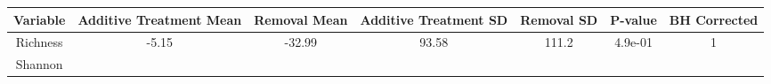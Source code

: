 \documentclass[12pt,]{article}
\begin{document}
\begin{longtable}[]{@{}ccccccc@{}}
\toprule
\begin{minipage}[b]{0.14\columnwidth}\centering\strut
Variable\strut
\end{minipage} & \begin{minipage}[b]{0.16\columnwidth}\centering\strut
Additive Treatment Mean\strut
\end{minipage} & \begin{minipage}[b]{0.10\columnwidth}\centering\strut
Removal Mean\strut
\end{minipage} & \begin{minipage}[b]{0.15\columnwidth}\centering\strut
Additive Treatment SD\strut
\end{minipage} & \begin{minipage}[b]{0.09\columnwidth}\centering\strut
Removal SD\strut
\end{minipage} & \begin{minipage}[b]{0.07\columnwidth}\centering\strut
P-value\strut
\end{minipage} & \begin{minipage}[b]{0.10\columnwidth}\centering\strut
BH Corrected\strut
\end{minipage}\tabularnewline
\midrule
\endhead
\begin{minipage}[t]{0.14\columnwidth}\centering\strut
Richness\strut
\end{minipage} & \begin{minipage}[t]{0.16\columnwidth}\centering\strut
-5.15\strut
\end{minipage} & \begin{minipage}[t]{0.10\columnwidth}\centering\strut
-32.99\strut
\end{minipage} & \begin{minipage}[t]{0.15\columnwidth}\centering\strut
93.58\strut
\end{minipage} & \begin{minipage}[t]{0.09\columnwidth}\centering\strut
111.2\strut
\end{minipage} & \begin{minipage}[t]{0.07\columnwidth}\centering\strut
4.9e-01\strut
\end{minipage} & \begin{minipage}[t]{0.10\columnwidth}\centering\strut
1\strut
\end{minipage}\tabularnewline
\begin{minipage}[t]{0.14\columnwidth}\centering\strut
Shannon\strut
\end{minipage} & \begin{minipage}[t]{0.16\columnwidth}\centering\strut

\end{minipage}
\end{longtable}
\end{document}
